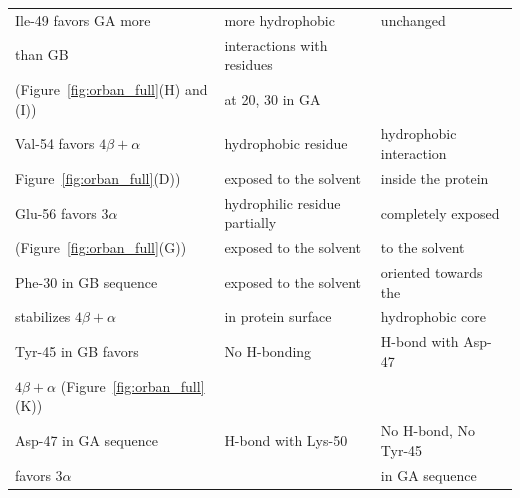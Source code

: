 \documentclass[12pt]{article}
\begin{document}
\begin{table}
\begin{center}
\begin{tabular}{| l | l | l |}
    Ile-49 favors GA more                      & more hydrophobic               &  unchanged                                              \\
    than GB                                    & interactions with residues     &                                                         \\
    (Figure~\ref{fig:orban_full}(H) and (I))  &  at 20, 30 in GA                &                                                         \\ \hline
    Val-54 favors $4 \beta + \alpha$           & hydrophobic residue            & hydrophobic interaction                                \\
    Figure~\ref{fig:orban_full}(D))             & exposed to the solvent        & inside the protein                                      \\ \hline
    Glu-56 favors $3 \alpha$                   & hydrophilic residue partially  & completely exposed                                    \\
    (Figure~\ref{fig:orban_full}(G))            & exposed to the solvent         & to the solvent                                        \\ \hline
    Phe-30 in GB sequence                      & exposed to the solvent         & oriented towards the                                  \\
    stabilizes $4 \beta + \alpha$                  & in protein surface             & hydrophobic core                                      \\ \hline
    Tyr-45 in GB favors                      & No H-bonding                   & H-bond with Asp-47                                    \\
    $4 \beta + \alpha$ (Figure~\ref{fig:orban_full}(K))&                 &                                                       \\ \hline
    Asp-47 in GA sequence                      & H-bond with Lys-50             & No H-bond, No Tyr-45                                  \\
    favors $3 \alpha$                          &                         & in GA sequence                                         \\ \hline
\end{tabular}
\end{center}
\end{table}
\end{document}
